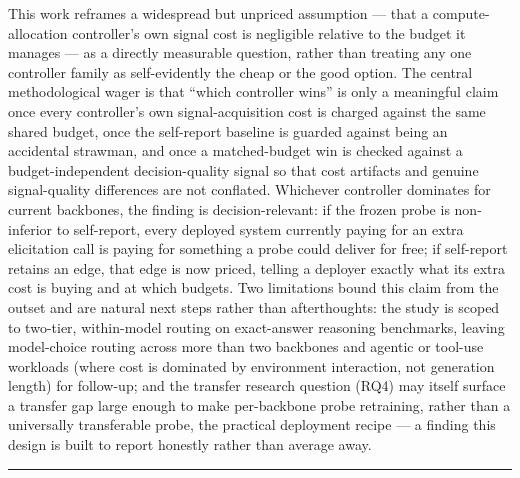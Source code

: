 \documentclass[11pt]{article}
\begin{document}
This work reframes a widespread but unpriced assumption --- that a compute-allocation controller's own signal cost is negligible relative to the budget it manages --- as a directly measurable question, rather than treating any one controller family as self-evidently the cheap or the good option. The central methodological wager is that ``which controller wins'' is only a meaningful claim once every controller's own signal-acquisition cost is charged against the same shared budget, once the self-report baseline is guarded against being an accidental strawman, and once a matched-budget win is checked against a budget-independent decision-quality signal so that cost artifacts and genuine signal-quality differences are not conflated. Whichever controller dominates for current backbones, the finding is decision-relevant: if the frozen probe is non-inferior to self-report, every deployed system currently paying for an extra elicitation call is paying for something a probe could deliver for free; if self-report retains an edge, that edge is now priced, telling a deployer exactly what its extra cost is buying and at which budgets. Two limitations bound this claim from the outset and are natural next steps rather than afterthoughts: the study is scoped to two-tier, within-model routing on exact-answer reasoning benchmarks, leaving model-choice routing across more than two backbones and agentic or tool-use workloads (where cost is dominated by environment interaction, not generation length) for follow-up; and the transfer research question (RQ4) may itself surface a transfer gap large enough to make per-backbone probe retraining, rather than a universally transferable probe, the practical deployment recipe --- a finding this design is built to report honestly rather than average away.

\vspace{1em}
\hrule
\vspace{1em}
\end{document}
